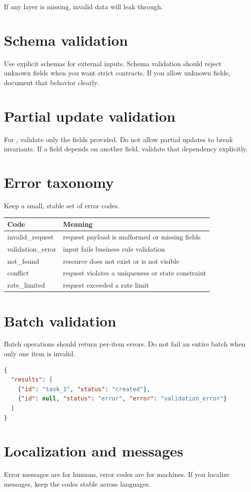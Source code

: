If any layer is missing, invalid data will leak through.

\section{Schema validation}
Use explicit schemas for external inputs.
Schema validation should reject unknown fields when you want strict contracts.
If you allow unknown fields, document that behavior clearly.

\section{Partial update validation}
For , validate only the fields provided.
Do not allow partial updates to break invariants.
If a field depends on another field, validate that dependency explicitly.

\section{Error taxonomy}
Keep a small, stable set of error codes.

\begin{tabularx}{\textwidth}{@{}lX@{}}
\toprule
Code & Meaning \\
\midrule
invalid\_request & request payload is malformed or missing fields \\
validation\_error & input fails business rule validation \\
not\_found & resource does not exist or is not visible \\
conflict & request violates a uniqueness or state constraint \\
rate\_limited & request exceeded a rate limit \\
\bottomrule
\end{tabularx}

\section{Batch validation}
Batch operations should return per-item errors.
Do not fail an entire batch when only one item is invalid.

\begin{lstlisting}[language=JSON]
{
  "results": [
    {"id": "task_1", "status": "created"},
    {"id": null, "status": "error", "error": "validation_error"}
  ]
}
\end{lstlisting}

\section{Localization and messages}
Error messages are for humans, error codes are for machines.
If you localize messages, keep the codes stable across languages.

